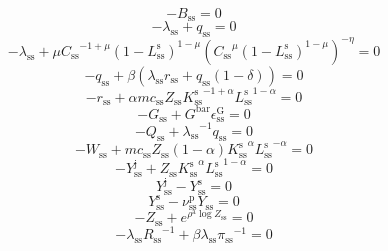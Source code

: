\begin{equation}
-B_\mathrm{ss} = 0
\end{equation}
\begin{equation}
-\lambda_\mathrm{ss} + q_\mathrm{ss} = 0
\end{equation}
\begin{equation}
-\lambda_\mathrm{ss} + {\mu} {{C_\mathrm{ss}}^{-1 + \mu}} {\left(1 - L^{\mathrm{s}}_\mathrm{ss}\right)^{1 - \mu}} {\left({{C_\mathrm{ss}}^{\mu}} {\left(1 - L^{\mathrm{s}}_\mathrm{ss}\right)^{1 - \mu}}\right)^{-\eta}} = 0
\end{equation}
\begin{equation}
-q_\mathrm{ss} + {\beta} \left({\lambda_\mathrm{ss}} {r_\mathrm{ss}} + {q_\mathrm{ss}} \left(1 - \delta\right)\right) = 0
\end{equation}
\begin{equation}
-r_\mathrm{ss} + {\alpha} {{m\!c}_\mathrm{ss}} {Z_\mathrm{ss}} {{K^{\mathrm{s}}_\mathrm{ss}}^{-1 + \alpha}} {{L^{\mathrm{s}}_\mathrm{ss}}^{1 - \alpha}} = 0
\end{equation}
\begin{equation}
-G_\mathrm{ss} + {G^{\mathrm{bar}}} {\epsilon^{\mathrm{G}}_\mathrm{ss}} = 0
\end{equation}
\begin{equation}
-Q_\mathrm{ss} + {\lambda_\mathrm{ss}}^{-1} {q_\mathrm{ss}} = 0
\end{equation}
\begin{equation}
-W_\mathrm{ss} + {{m\!c}_\mathrm{ss}} {Z_\mathrm{ss}} \left(1 - \alpha\right) {{K^{\mathrm{s}}_\mathrm{ss}}^{\alpha}} {{L^{\mathrm{s}}_\mathrm{ss}}^{-\alpha}} = 0
\end{equation}
\begin{equation}
-Y^{\mathrm{j}}_\mathrm{ss} + {Z_\mathrm{ss}} {{K^{\mathrm{s}}_\mathrm{ss}}^{\alpha}} {{L^{\mathrm{s}}_\mathrm{ss}}^{1 - \alpha}} = 0
\end{equation}
\begin{equation}
Y^{\mathrm{j}}_\mathrm{ss} - Y^{\mathrm{s}}_\mathrm{ss} = 0
\end{equation}
\begin{equation}
Y^{\mathrm{s}}_\mathrm{ss} - {\nu^{\mathrm{p}}_\mathrm{ss}} {Y_\mathrm{ss}} = 0
\end{equation}
\begin{equation}
-Z_\mathrm{ss} + e^{{\rho^{\mathrm{a}}} {\log{Z_\mathrm{ss}}}} = 0
\end{equation}
\begin{equation}
-{\lambda_\mathrm{ss}} {R_\mathrm{ss}}^{-1} + {\beta} {\lambda_\mathrm{ss}} {\pi_\mathrm{ss}}^{-1} = 0
\end{equation}
